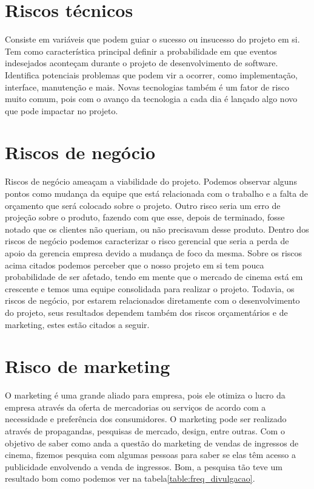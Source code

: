 \documentclass[12pt]{article}
\begin{document}
    \section{Riscos técnicos}
        Consiste em variáveis que podem guiar o sucesso ou insucesso do projeto em si. Tem como característica principal definir a probabilidade em que eventos indesejados aconteçam durante o projeto de desenvolvimento de software. Identifica potenciais problemas que podem vir a ocorrer, como implementação, interface, manutenção e mais. Novas tecnologias também é um fator de risco muito comum, pois com o avanço da tecnologia a cada dia é lançado algo novo que pode impactar no projeto.
    \section{Riscos de negócio}
        Riscos de negócio ameaçam a viabilidade do projeto. Podemos observar alguns pontos como mudança da equipe que está relacionada com o trabalho e a falta de orçamento que será colocado sobre o projeto. Outro risco seria um erro de projeção sobre o produto, fazendo com que esse, depois de terminado, fosse notado que os clientes não queriam, ou não precisavam desse produto. 
        Dentro dos riscos de negócio podemos caracterizar o risco gerencial que seria a perda de apoio da gerencia empresa devido a mudança de foco da mesma. 
        Sobre os riscos acima citados podemos perceber que o nosso projeto em si tem pouca probabilidade de ser afetado, tendo em mente que o mercado de cinema está em crescente e temos uma equipe consolidada para realizar o projeto.
        Todavia, os riscos de negócio, por estarem relacionados diretamente com o desenvolvimento do projeto, seus resultados dependem também dos riscos orçamentários e de marketing, estes estão citados a seguir.
    \section{Risco de marketing}
        O marketing é uma grande aliado para empresa, pois ele otimiza o lucro da empresa através da oferta de mercadorias ou serviços de acordo com a necessidade e preferência dos consumidores. 
        O marketing pode ser realizado através de propagandas, pesquisas de mercado, design, entre outras. 
        Com o objetivo de saber como anda a questão do marketing de vendas de ingressos de cinema, fizemos pesquisa com algumas pessoas para saber se elas têm acesso a publicidade envolvendo a venda de ingressos. Bom, a pesquisa tão teve um resultado bom como podemos ver na tabela\ref{table:freq_divulgacao}.
        
\end{document}
